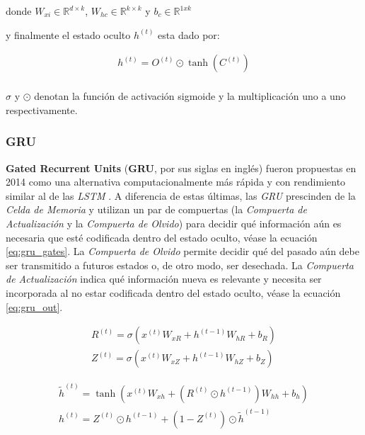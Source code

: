 \noindent donde $W_{xi} \in \mathbb{R}^{d \times k}$,
$W_{hc} \in \mathbb{R}^{k \times k}$ y $b_c \in \mathbb{R}^{1xk}$

\noindent y finalmente el estado oculto $h^{(t)}$ esta dado por:

\begin{equation}
    \begin{split}
        h^{(t)} =  O^{(t)} \odot \tanh(C^{(t)}) \\
    \end{split}
\end{equation}

\noindent $\sigma$ y $\odot$ denotan la función de activación sigmoide y la multiplicación uno a uno
respectivamente.


\subsubsection{GRU}

\textbf{Gated Recurrent Units} (\textbf{GRU}, por sus siglas en inglés) fueron propuestas en 2014
\cite{GRU1} como una alternativa computacionalmente más rápida y con rendimiento similar al de las
\textit{LSTM} \cite{GRU2}. A diferencia de estas últimas, las \textit{GRU} prescinden de la
\textit{Celda de Memoria} y utilizan un par de compuertas (la \textit{Compuerta de Actualización} y
la \textit{Compuerta de Olvido}) para decidir qué información aún es necesaria que esté codificada dentro del
estado oculto, véase la ecuación \ref{eq:gru_gates}.
La \textit{Compuerta de Olvido} permite decidir qué del pasado aún debe ser transmitido a futuros
estados o, de otro modo, ser desechada. La \textit{Compuerta de Actualización} indica qué información nueva es relevante y
necesita ser incorporada al no estar codificada dentro del estado oculto,
véase la ecuación \ref{eq:gru_out}.


\begin{equation}
    \begin{split}
        R^{(t)} = \sigma(x^{(t)} W_{xR} + h^{(t-1)} W_{hR} + b_R)\\
        Z^{(t)} = \sigma(x^{(t)} W_{xZ} + h^{(t-1)} W_{hZ} + b_Z)
    \end{split}
    \label{eq:gru_gates}
\end{equation}

\begin{equation}
    \begin{split}
        \tilde h^{(t)} = \tanh(x^{(t)} W_{xh} + ( R^{(t)} \odot h^{(t-1)}) W_{hh} + b_h)\\
        h^{(t)} =  Z^{(t)} \odot h^{(t-1)} + (1 - Z^{(t)}) \odot \tilde h^{(t-1)} \\
    \end{split}
    \label{eq:gru_out}
\end{equation}


